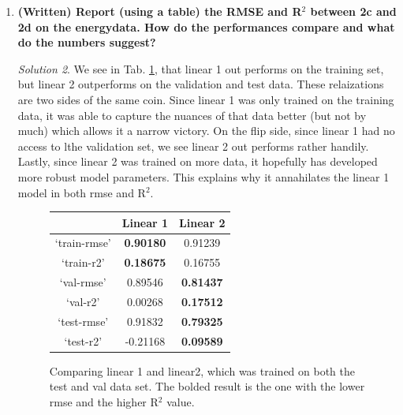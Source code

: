 \documentclass[a4paper,12pt]{article}
\theoremstyle{definition}
\theoremstyle{remark}
\newtheorem*{solution}{Solution}
\begin{document}
\begin{enumerate}
\begin{enumerate}
		\begin{solution}
			Implimented in \texttt{q2.py}.
		\end{solution}
		\item {\bf(Written) Report (using a table) the RMSE and R$^2$ between 2c and 2d on the energydata. How do the performances compare and what do the numbers suggest?}
		\begin{solution}
			We see in Tab. \ref{tab:trainvtest}, that linear 1 out performs on the training set, but linear 2 outperforms on the validation and test data. These relaizations are two sides of the same coin. Since linear 1 was only trained on the training data, it was able to capture the nuances of that data better (but not by much) which allows it a narrow victory. On the flip side, since linear 1 had no access to lthe validation set, we see linear 2 out performs rather handily. Lastly, since linear 2 was trained on more data, it hopefully has developed more robust model parameters. This explains why it annahilates the linear 1 model in both rmse and R$^2$.
			\begin{figure}
			\centering
			\begin{tabular}{c|c|c}
				& Linear 1 & Linear 2 \\
				\hline\hline
				`train-rmse'&{\bf0.90180} &0.91239  \\
				`train-r2'& {\bf0.18675} & 0.16755 \\
				\hline
				`val-rmse'&0.89546& {\bf0.81437} \\
				`val-r2'& 0.00268 & {\bf0.17512}\\
				\hline
				`test-rmse'& 0.91832 & {\bf0.79325 }\\
				`test-r2'& -0.21168& {\bf0.09589}  \\
			\end{tabular}
			\caption{Comparing linear 1 and linear2, which was trained on both the test and val data set. The bolded result is the one with the lower rmse and the higher R$^2$ value.}
			\label{tab:trainvtest}
		\end{figure}
			

\end{solution}
\end{enumerate}
\end{enumerate}
\end{document}
